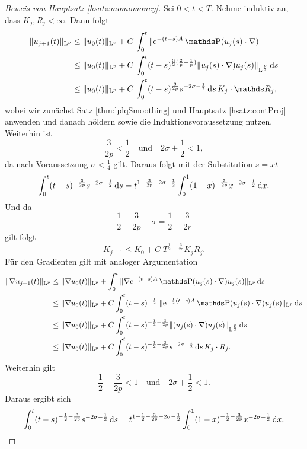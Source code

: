 \begin{proof}[Beweis von Hauptsatz \ref{hsatz:momomoney}]
  Sei $0 < t < T$. 
  Nehme induktiv an, dass $K_j, R_j < \infty$.
  Dann folgt
  \begin{align*}
    \|u_{j + 1}(t) \|_{\Ell^p}
    &\leq \|u_0(t)\|_{\Ell^p} + C \, \int_0^t \|\e^{-(t - s) A} \PP(u_j(s) \cdot \nabla) \\
    &\leq \|u_0(t)\|_{\Ell^p} + C \, \int_0^t (t - s)^{\frac{3}{2} (\frac{2}{p} - \frac{1}{p})} \|u_j(s) \cdot \nabla) u_j(s) \|_{\Ell^{\frac{p}{2}}} \d s \\
    &\leq \|u_0(t)\|_{\Ell^p} + C \, \int_0^t (t - s)^{\frac{3}{2p}} s^{-2\sigma - \frac{1}{2}} \d s \, K_j \cdot \R_j,
  \end{align*}
  wobei wir zunächst Satz \ref{thm:lplqSmoothing} und Hauptsatz \ref{hsatz:contProj} anwenden und danach höldern sowie die Induktionsvoraussetzung nutzen.
  Weiterhin ist
  $$
  \frac{3}{2p} < \frac{1}{2} \quad\text{und}\quad 2\sigma + \frac{1}{2} < 1,
  $$
  da nach Voraussetzung $\sigma < \frac{1}{4}$ gilt.
  Daraus folgt mit der Substitution $s = xt$
  $$
  \int_0^t (t - s)^{-\frac{3}{2p}} s^{-2\sigma - \frac{1}{2}} \, {\operatorname{d}\!{s}} = t^{1 - \frac{3}{2p} - 2\sigma - \frac{1}{2}} \int_0^1 ( 1 - x )^{-\frac{3}{2p}}  x^{- 2\sigma - \frac{1}{2}} \, {\operatorname{d}\!{x}}.
  $$
  Und da
  $$
  \frac{1}{2} - \frac{3}{2p} - \sigma = \frac{1}{2} - \frac{3}{2r}
  $$
  gilt folgt
  $$
  K_{j + 1} \leq K_0 + C\; T^{\frac{1}{2} - \frac{3}{2r}} K_j R_j.
  $$
  Für den Gradienten gilt mit analoger Argumentation
  \begin{align*}
    \|\nabla u_{j + 1}(t) \|_{\Ell^p}
    &\leq \|\nabla u_0 (t) \|_{\Ell^p} + \int_0^t \|\nabla \e^{-(t - s) A} \PP(u_j(s) \cdot \nabla) u_j(s) \|_{\Ell^p} \d s \\
    &\leq \|\nabla u_0(t) \|_{\Ell^p} + C \int_0^t (t - s)^{-\frac{1}{2}} \; \|\e^{-\frac{1}{2}(t - s)A} \PP(u_j(s) \cdot \nabla) u_j(s) \|_{\Ell^p} \d s \\
    &\leq \|\nabla u_0(t) \|_{\Ell^p} + C \int_0^t (t - s)^{-\frac{1}{2} - \frac{3}{2p}} \|(u_j(s) \cdot \nabla) u_j(s) \|_{\Ell^{\frac{p}{2}}} \d s \\ 
    &\leq \|\nabla u_0(t) \|_{\Ell^p} + C \int_0^t (t - s)^{-\frac{1}{2} - \frac{3}{2p}} s^{-2\sigma - \frac{1}{2}} \d s \, K_j \cdot R_j.
  \end{align*}
  Weiterhin gilt
  $$
  \frac{1}{2} + \frac{3}{2p} < 1 \quad\text{und}\quad 2\sigma + \frac{1}{2} < 1.
  $$
  Daraus ergibt sich
  $$
  \int_0^t (t - s)^{-\frac{1}{2} - \frac{3}{2p}} s^{-2\sigma - \frac{1}{2}} \, {\operatorname{d}\!{s}} 
  = t^{1 - \frac{1}{2} - \frac{3}{2p} - 2\sigma - \frac{1}{2}} \int_0^1 (1 - x)^{-\frac{1}{2} - \frac{3}{2p}} x^{-2\sigma - \frac{1}{2}} \, {\operatorname{d}\!{x}}.
$$
\end{proof}
